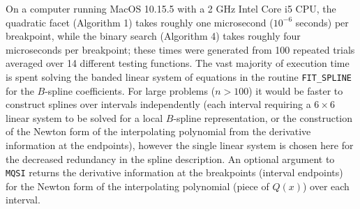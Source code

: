 On a computer running MacOS 10.15.5 with a 2 GHz Intel Core i5 CPU, the
quadratic facet (Algorithm 1) takes roughly one microsecond ($10^{-6}$
seconds) per breakpoint, while the binary search (Algorithm 4) takes roughly
four microseconds per breakpoint; these times were generated from 100
repeated trials averaged over 14 different testing functions.  The vast
majority of execution time is spent solving the banded linear system of
equations in the routine {\tt FIT\_SPLINE} for the $B$-spline coefficients.
For large problems ($n > 100$) it would be faster to construct splines
over intervals independently (each interval requiring a $6 \times 6$ linear
system to be solved for a local $B$-spline representation, or the
construction of the Newton form of the interpolating polynomial from the
derivative information at the endpoints), however the single linear system
is chosen here for the decreased redundancy in the spline description. An
optional argument to {\tt MQSI} returns the derivative information at the
breakpoints (interval endpoints) for the Newton form of the interpolating
polynomial (piece of $Q(x)$) over each interval.
